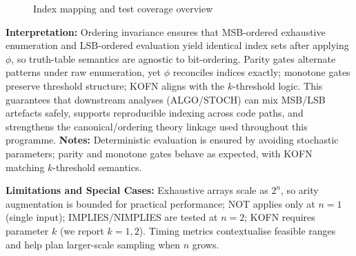 \begin{figure}[h]
\centering
{}
\caption{Index mapping and test coverage overview}
\end{figure}
\textbf{Interpretation:} Ordering invariance ensures that MSB-ordered exhaustive enumeration and LSB-ordered evaluation yield identical index sets after applying $\phi$, so truth-table semantics are agnostic to bit-ordering. Parity gates alternate patterns under raw enumeration, yet $\phi$ reconciles indices exactly; monotone gates preserve threshold structure; KOFN aligns with the $k$-threshold logic. This guarantees that downstream analyses (ALGO/STOCH) can mix MSB/LSB artefacts safely, supports reproducible indexing across code paths, and strengthens the canonical/ordering theory linkage used throughout this programme.
\textbf{Notes:} Deterministic evaluation is ensured by avoiding stochastic parameters; parity and monotone gates behave as expected, with KOFN matching $k$-threshold semantics.

\textbf{Limitations and Special Cases:} Exhaustive arrays scale as $2^n$, so arity augmentation is bounded for practical performance; NOT applies only at $n=1$ (single input); IMPLIES/NIMPLIES are tested at $n=2$; KOFN requires parameter $k$ (we report $k=1,2$). Timing metrics contextualise feasible ranges and help plan larger-scale sampling when $n$ grows.

